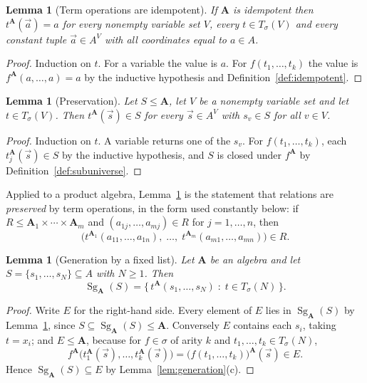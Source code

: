 \documentclass[11pt]{article}
\theoremstyle{mainplain}
\newtheorem{lemma}[theorem]{Lemma}
\theoremstyle{mainroman}
\theoremstyle{definition}
\numberwithin{equation}{section}
\DeclareMathOperator{\Sg}{Sg}
\newcommand{\bA}{\mathbf A}
\newcommand{\Tm}{T_\sigma}
\begin{document}
\begin{lemma}[Term operations are idempotent]\label{lem:term-idempotent}
If $\bA$ is idempotent then $t^{\bA}(\vec a)=a$ for every nonempty variable set
$V$, every $t\in\Tm(V)$ and every constant tuple $\vec a\in A^{V}$ with all
coordinates equal to $a\in A$.
\end{lemma}
\begin{proof}
Induction on $t$. For a variable the value is $a$. For $f(t_1,\dots,t_k)$ the
value is $f^{\bA}(a,\dots,a)=a$ by the inductive hypothesis and
Definition~\ref{def:idempotent}.
\end{proof}

\begin{lemma}[Preservation]\label{lem:preservation}
Let $S\le\bA$, let $V$ be a nonempty variable set and let $t\in\Tm(V)$. Then
$t^{\bA}(\vec s)\in S$ for every $\vec s\in A^{V}$ with $s_v\in S$ for all
$v\in V$.
\end{lemma}
\begin{proof}
Induction on $t$. A variable returns one of the $s_v$. For $f(t_1,\dots,t_k)$,
each $t_j^{\bA}(\vec s)\in S$ by the inductive hypothesis, and $S$ is closed
under $f^{\bA}$ by Definition~\ref{def:subuniverse}.
\end{proof}

Applied to a product algebra, Lemma~\ref{lem:preservation} is the statement that
relations are \emph{preserved} by term operations, in the form used constantly
below: if $R\le\bA_1\times\cdots\times\bA_m$ and
$(a_{1j},\dots,a_{mj})\in R$ for $j=1,\dots,n$, then
\[
 \bigl(t^{\bA_1}(a_{11},\dots,a_{1n}),\;\dots,\;t^{\bA_m}(a_{m1},\dots,a_{mn})\bigr)\in R .
\]

\begin{lemma}[Generation by a fixed list]\label{lem:sg-terms}
Let $\bA$ be an algebra and let $S=\{s_1,\dots,s_N\}\subseteq A$ with $N\ge1$.
Then
\[
 \Sg_{\bA}(S)=\{\,t^{\bA}(s_1,\dots,s_N)\;:\;t\in\Tm(N)\,\}.
\]
\end{lemma}
\begin{proof}
Write $E$ for the right-hand side. Every element of $E$ lies in $\Sg_{\bA}(S)$
by Lemma~\ref{lem:preservation}, since $S\subseteq\Sg_{\bA}(S)\le\bA$.
Conversely $E$ contains each $s_i$, taking $t=x_i$; and $E\le\bA$, because for
$f\in\sigma$ of arity $k$ and $t_1,\dots,t_k\in\Tm(N)$,
\[
  f^{\bA}\bigl(t_1^{\bA}(\vec s),\dots,t_k^{\bA}(\vec s)\bigr)
  = \bigl(f(t_1,\dots,t_k)\bigr)^{\bA}(\vec s)\in E .
\]
Hence $\Sg_{\bA}(S)\subseteq E$ by Lemma~\ref{lem:generation}(c).
\end{proof}
\end{document}
